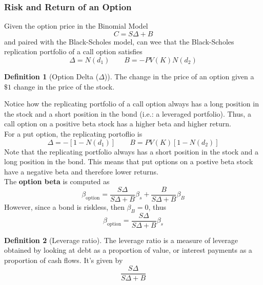 \documentclass[11pt]{article}
\theoremstyle{definition}
\newtheorem*{definition}{Definition}
\begin{document}
\subsubsection{Risk and Return of an Option}
Given the option price in the Binomial Model 
\begin{equation*}
    C = S\Delta + B
\end{equation*}
and paired with the Black-Scholes model, can wee that the Black-Scholes replication portfolio of a call option satisfies 
\begin{equation*}
    \Delta = N(d_1) \qquad B = -PV(K)N(d_2)
\end{equation*}
\begin{definition}[Option Delta ($\Delta$)]
    The change in the price of an option given a $\$1$ change in the price of the stock.
\end{definition}
Notice how the replicating portfolio of a call option always has a long position in the stock and a short position in the bond (i.e.: a leveraged portfolio). Thus, a call option on a positive beta stock has a higher beta and higher return.\\
For a put option, the replicating portoflio is 
\begin{equation*}
    \Delta = -[1 - N(d_1)] \qquad B = PV(K)[1 - N(d_2)]
\end{equation*}
Note that the replicating portfolio always has a short position in the stock and a long position in the bond. This means that put options on a postive beta stock have a negative beta and therefore lower returns.\\
The \textbf{option beta} is computed as 
\begin{equation*}
    \beta_{\text{option}} = \frac{S\Delta}{S\Delta + B}\beta_s + \frac{B}{S\Delta + B}\beta_B
\end{equation*}
However, since a bond is riskless, then $\beta_B = 0$, thus 
\begin{equation*}
    \beta_{\text{option}} = \frac{S\Delta}{S\Delta + B} \beta_s
\end{equation*}
\begin{definition}[Leverage ratio]
The leverage ratio is a measure of leverage obtained by looking at debt as a proportion of value, or interest payments as a proportion of cash flows. It's given by 
\begin{equation*}
    \frac{S\Delta}{S\Delta + B}
\end{equation*}
\end{definition}
\end{document}
